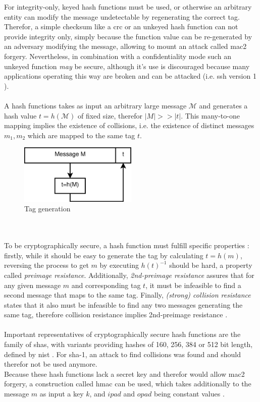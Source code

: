 For integrity-only, keyed hash functions must be used, or
otherwise an arbitrary entity can modify the message undetectable by regenerating the correct tag. Therefor, a simple checksum like a \gls{crc} or an unkeyed 
hash function can not provide integrity only, simply because the function value can be re-generated by an adversary modifying the message, allowing to mount
an attack called \gls{mac2} forgery.
Nevertheless, in combination with a confidentiality mode such an unkeyed function \textit{may} be secure, although it's use is discouraged because many applications operating
this way are broken and can be attacked (i.e. \gls{ssh} version 1 \cite{zalewskissh}).
\\
\\
A hash functions takes as input an arbitrary large message $\mathcal{M}$ and generates a hash value $t = h(\mathcal{M})$ of fixed size, therefor $|M| >> |t|$. This many-to-one
mapping implies the existence of collisions, i.e. the existence of distinct messages $m_1, m_2$ which are mapped to the same tag $t$.
\begin{figure}
    \centering
    \includegraphics[width=0.5\textwidth]{figures/tag.eps}
    \caption{Tag generation}
    \label{fig:tag}
\end{figure}
\\
\\
To be cryptographically secure, a hash function must fulfill specific properties \cite{6732428}: firstly, while it should be easy to generate the tag
by calculating $t = h(m)$, reversing the process to get $m$ by executing $h(t)^{-1}$ should be hard, a property called \textit{preimage resistance}. 
Additionally, \textit{2nd-preimage resistance} assures that for any given message $m$ and corresponding tag $t$, it must be infeasible to find a second message
that maps to the same tag. Finally, \textit{(strong) collision resistance} states that it also must be infeasible to find any two messages generating
the same tag, therefore collision resistance implies 2nd-preimage resistance \cite{handbookCR}.
\\
\\
Important representatives of cryptographically secure hash functions are the family of \glspl{sha}, with variants providing hashes of 160, 256, 384 or 512 bit 
length, defined by \gls{nist} \cite{nistSHA}. For \gls{sha}-1, an attack to find collisions was found \cite{Wang05findingcollisions} and should therefor not
be used anymore.
\\
Because these hash functions lack a secret key and therefor would allow \gls{mac2} forgery, a construction called \gls{hmac} can be used, which takes 
additionally to the message $m$ as input a key $k$, and $ipad$ and $opad$ being constant values \cite{hmac}.

